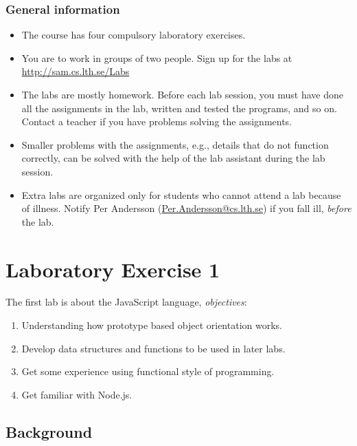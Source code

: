 \documentclass[fleqn, article, a4paper]{memoir}
\begin{document}
\maketitle
\thispagestyle{titlepage}
\vspace{-4cm}

\subsubsection*{General information}

\begin{itemize}\firmlist
\item The course has four compulsory laboratory exercises. 
\item You are to work in groups of two people. Sign up for the labs at \url{http://sam.cs.lth.se/Labs}
\item The labs are mostly homework. Before each lab session, you must have done all the assign\-ments in the lab, written and tested the programs, and so on. Contact a teacher if you have problems solving the assignments. 
\item Smaller problems with the assignments, e.g., details that do not function correctly, can be solved with the help of the lab assistant during the lab session. 
\item Extra labs are organized only for students who cannot attend a lab because of illness. Notify Per Andersson (\url{Per.Andersson@cs.lth.se}) if you fall ill, \emph{before} the lab.
\end{itemize}

\section*{Laboratory Exercise 1}
\n The first lab is about the JavaScript language, \emph{objectives}:

\begin{enumerate}\firmlist
\item Understanding how prototype based object orientation works.
\item Develop data structures and functions to be used in later labs.
\item Get some experience using functional style of programming.
\item Get familiar with Node.js.
\end{enumerate}

\subsection*{Background}
\end{document}
